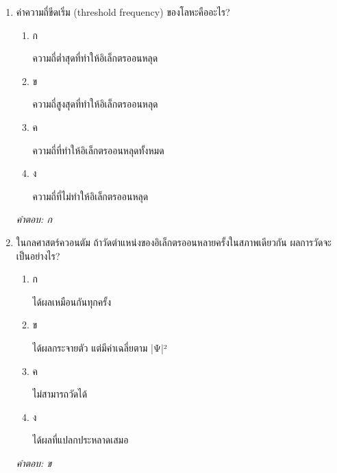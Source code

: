 \documentclass[12pt]{article}
\begin{document}
\begin{enumerate}[label=\arabic*., itemsep=0.5\baselineskip, topsep=0.5\baselineskip, leftmargin=*]
\item ค่าความถี่ขีดเริ่ม (threshold frequency) ของโลหะคืออะไร?
\begin{enumerate}[label=\alph*)., itemsep=0.3\baselineskip, topsep=0.3\baselineskip]
\item ก\ 
\begin{minipage}[t]{0.9\linewidth}
\raggedright ความถี่ต่ำสุดที่ทำให้อิเล็กตรออนหลุด
\end{minipage}
\item ข\ 
\begin{minipage}[t]{0.9\linewidth}
\raggedright ความถี่สูงสุดที่ทำให้อิเล็กตรออนหลุด
\end{minipage}
\item ค\ 
\begin{minipage}[t]{0.9\linewidth}
\raggedright ความถี่ที่ทำให้อิเล็กตรออนหลุดทั้งหมด
\end{minipage}
\item ง\ 
\begin{minipage}[t]{0.9\linewidth}
\raggedright ความถี่ที่ไม่ทำให้อิเล็กตรออนหลุด
\end{minipage}
\end{enumerate}
\vspace{-0.3\baselineskip}
\begin{small}
\textit{คำตอบ: ก}
\end{small}

\item ในกลศาสตร์ควอนตัม ถ้าวัดตำแหน่งของอิเล็กตรออนหลายครั้งในสภาพเดียวกัน ผลการวัดจะเป็นอย่างไร?
\begin{enumerate}[label=\alph*)., itemsep=0.3\baselineskip, topsep=0.3\baselineskip]
\item ก\ 
\begin{minipage}[t]{0.9\linewidth}
\raggedright ได้ผลเหมือนกันทุกครั้ง
\end{minipage}
\item ข\ 
\begin{minipage}[t]{0.9\linewidth}
\raggedright ได้ผลกระจายตัว แต่มีค่าเฉลี่ยตาม |Ψ|²
\end{minipage}
\item ค\ 
\begin{minipage}[t]{0.9\linewidth}
\raggedright ไม่สามารถวัดได้
\end{minipage}
\item ง\ 
\begin{minipage}[t]{0.9\linewidth}
\raggedright ได้ผลที่แปลกประหลาดเสมอ
\end{minipage}
\end{enumerate}
\vspace{-0.3\baselineskip}
\begin{small}
\textit{คำตอบ: ข}
\end{small}


\end{enumerate}
\end{document}
